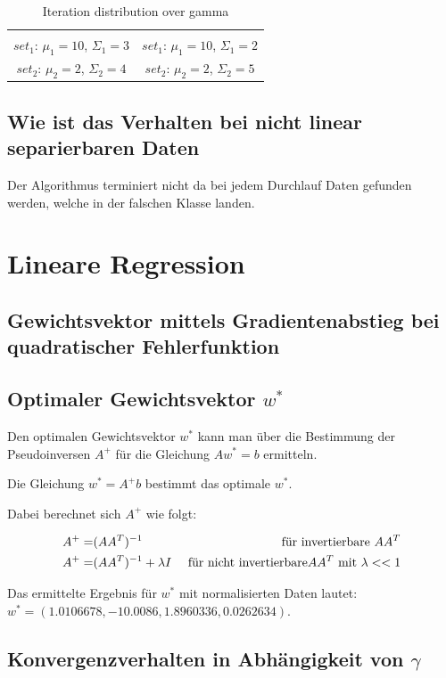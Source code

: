 \documentclass[]{report}
\begin{document}
\begin{table}[h]
\begin{tabular}{| c | c |}
 & \\
$set_1$: $\mu_1=10$, $\Sigma_1=3$ & $set_1$: $\mu_1=10$, $\Sigma_1=2$ \\
$set_2$: $\mu_2=2$, $\Sigma_2=4$ & $set_2$: $\mu_2=2$, $\Sigma_2=5$ \\
\hline
\end{tabular}
\caption{Iteration distribution over gamma}
\label{tab:DataSetsAndBounds}
\end{table}


\subsection{Wie ist das Verhalten bei nicht linear separierbaren Daten}

Der Algorithmus terminiert nicht da bei jedem Durchlauf Daten gefunden werden, welche in der falschen Klasse landen.

\section{Lineare Regression}

\subsection{Gewichtsvektor mittels Gradientenabstieg bei quadratischer Fehlerfunktion}

\subsection{Optimaler Gewichtsvektor $w^*$}

Den optimalen Gewichtsvektor $w^*$ kann man \"uber die Bestimmung der Pseudoinversen $A^+$ f\"ur die Gleichung $Aw^*=b$ ermitteln.

Die Gleichung $w^*=A^+b$ bestimmt das optimale $w^*$. 

Dabei berechnet sich $A^+$ wie folgt:

\begin{eqnarray}
A^+ =& (AA^T)^{-1} &\textnormal{ f\"ur invertierbare } AA^T \\
A^+ =& (AA^T)^{-1} + \lambda I &\textnormal{ f\"ur nicht invertierbare} AA^T \textnormal{ mit } \lambda<<1
\end{eqnarray}

Das ermittelte Ergebnis f\"ur $w^*$ mit normalisierten Daten lautet: $w^*=(1.0106678, - 10.0086, 1.8960336, 0.0262634)$.

\subsection{Konvergenzverhalten in Abh\"angigkeit von $\gamma$}
\end{document}
